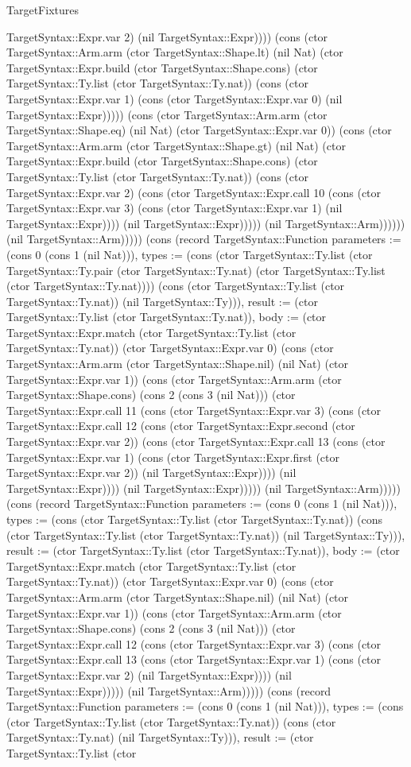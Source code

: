 \begin{lexlean}{TargetFixtures}
\begin{semanticmodule}
{TargetSyntax::Expr.var 2) (nil TargetSyntax::Expr)))) (cons (ctor TargetSyntax::Arm.arm (ctor TargetSyntax::Shape.lt) (nil Nat) (ctor TargetSyntax::Expr.build (ctor TargetSyntax::Shape.cons) (ctor TargetSyntax::Ty.list (ctor TargetSyntax::Ty.nat)) (cons (ctor TargetSyntax::Expr.var 1) (cons (ctor TargetSyntax::Expr.var 0) (nil TargetSyntax::Expr))))) (cons (ctor TargetSyntax::Arm.arm (ctor TargetSyntax::Shape.eq) (nil Nat) (ctor TargetSyntax::Expr.var 0)) (cons (ctor TargetSyntax::Arm.arm (ctor TargetSyntax::Shape.gt) (nil Nat) (ctor TargetSyntax::Expr.build (ctor TargetSyntax::Shape.cons) (ctor TargetSyntax::Ty.list (ctor TargetSyntax::Ty.nat)) (cons (ctor TargetSyntax::Expr.var 2) (cons (ctor TargetSyntax::Expr.call 10 (cons (ctor TargetSyntax::Expr.var 3) (cons (ctor TargetSyntax::Expr.var 1) (nil TargetSyntax::Expr)))) (nil TargetSyntax::Expr))))) (nil TargetSyntax::Arm)))))) (nil TargetSyntax::Arm))))}) (cons (record TargetSyntax::Function {parameters := (cons 0 (cons 1 (nil Nat))), types := (cons (ctor TargetSyntax::Ty.list (ctor TargetSyntax::Ty.pair (ctor TargetSyntax::Ty.nat) (ctor TargetSyntax::Ty.list (ctor TargetSyntax::Ty.nat)))) (cons (ctor TargetSyntax::Ty.list (ctor TargetSyntax::Ty.nat)) (nil TargetSyntax::Ty))), result := (ctor TargetSyntax::Ty.list (ctor TargetSyntax::Ty.nat)), body := (ctor TargetSyntax::Expr.match (ctor TargetSyntax::Ty.list (ctor TargetSyntax::Ty.nat)) (ctor TargetSyntax::Expr.var 0) (cons (ctor TargetSyntax::Arm.arm (ctor TargetSyntax::Shape.nil) (nil Nat) (ctor TargetSyntax::Expr.var 1)) (cons (ctor TargetSyntax::Arm.arm (ctor TargetSyntax::Shape.cons) (cons 2 (cons 3 (nil Nat))) (ctor TargetSyntax::Expr.call 11 (cons (ctor TargetSyntax::Expr.var 3) (cons (ctor TargetSyntax::Expr.call 12 (cons (ctor TargetSyntax::Expr.second (ctor TargetSyntax::Expr.var 2)) (cons (ctor TargetSyntax::Expr.call 13 (cons (ctor TargetSyntax::Expr.var 1) (cons (ctor TargetSyntax::Expr.first (ctor TargetSyntax::Expr.var 2)) (nil TargetSyntax::Expr)))) (nil TargetSyntax::Expr)))) (nil TargetSyntax::Expr))))) (nil TargetSyntax::Arm))))}) (cons (record TargetSyntax::Function {parameters := (cons 0 (cons 1 (nil Nat))), types := (cons (ctor TargetSyntax::Ty.list (ctor TargetSyntax::Ty.nat)) (cons (ctor TargetSyntax::Ty.list (ctor TargetSyntax::Ty.nat)) (nil TargetSyntax::Ty))), result := (ctor TargetSyntax::Ty.list (ctor TargetSyntax::Ty.nat)), body := (ctor TargetSyntax::Expr.match (ctor TargetSyntax::Ty.list (ctor TargetSyntax::Ty.nat)) (ctor TargetSyntax::Expr.var 0) (cons (ctor TargetSyntax::Arm.arm (ctor TargetSyntax::Shape.nil) (nil Nat) (ctor TargetSyntax::Expr.var 1)) (cons (ctor TargetSyntax::Arm.arm (ctor TargetSyntax::Shape.cons) (cons 2 (cons 3 (nil Nat))) (ctor TargetSyntax::Expr.call 12 (cons (ctor TargetSyntax::Expr.var 3) (cons (ctor TargetSyntax::Expr.call 13 (cons (ctor TargetSyntax::Expr.var 1) (cons (ctor TargetSyntax::Expr.var 2) (nil TargetSyntax::Expr)))) (nil TargetSyntax::Expr))))) (nil TargetSyntax::Arm))))}) (cons (record TargetSyntax::Function {parameters := (cons 0 (cons 1 (nil Nat))), types := (cons (ctor TargetSyntax::Ty.list (ctor TargetSyntax::Ty.nat)) (cons (ctor TargetSyntax::Ty.nat) (nil TargetSyntax::Ty))), result := (ctor TargetSyntax::Ty.list (ctor }
\end{semanticmodule}
\end{lexlean}

